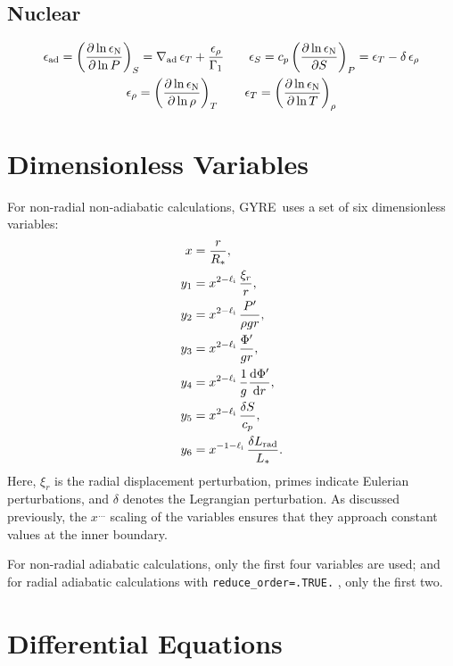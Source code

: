 \documentclass[fleqn]{article}
\newcommand{\gyre}{GYRE}
\newcommand{\diff}{\mathrm{d}}
\newcommand{\elli}{\ell_{\rm i}}
\newcommand{\nabad}{\nabla_{\rm ad}}
\newcommand{\epsad}{\epsilon_{\rm ad}}
\newcommand{\epsS}{\epsilon_{S}}
\newcommand{\epsrho}{\epsilon_{\rho}}
\newcommand{\epsT}{\epsilon_{T}}
\newcommand{\Rstar}{R_{\ast}}
\newcommand{\Lrad}{L_{\rm rad}}
\newcommand{\Lstar}{L_{\ast}}
\begin{document}
\subsection*{Nuclear}

\begin{gather*}
\epsad = \left( \frac{\partial \ln \epsilon_{\rm N}}{\partial \ln P} \right)_{S} = \nabad\, \epsT + \frac{\epsrho}{\Gamma_{1}} \qquad
\epsS = c_{p} \left( \frac{\partial \ln \epsilon_{\rm N}}{\partial S} \right)_{P} = \epsT - \delta\, \epsrho \\
\epsrho = \left( \frac{\partial \ln \epsilon_{\rm N}}{\partial \ln \rho} \right)_{T} \qquad
\epsT = \left( \frac{\partial \ln \epsilon_{\rm N}}{\partial \ln T} \right)_{\rho}
\end{gather*}


\section*{Dimensionless Variables}

For non-radial non-adiabatic calculations, \gyre\ uses a set of
six dimensionless variables:
\begin{align*}
x     &= \frac{r}{\Rstar}, \\
y_{1} &= x^{2-\elli}\, \frac{\xi_{r}}{r}, \\
y_{2} &= x^{2-\elli}\, \frac{P'}{\rho g r}, \\
y_{3} &= x^{2-\elli}\, \frac{\Phi'}{gr}, \\
y_{4} &= x^{2-\elli}\, \frac{1}{g} \frac{\diff \Phi'}{\diff r}, \\
y_{5} &= x^{2-\elli}\, \frac{\delta S}{c_{p}}, \\
y_{6} &= x^{-1-\elli}\, \frac{\delta \Lrad}{\Lstar}.
\end{align*}
Here, $\xi_{r}$ is the radial displacement perturbation, primes
indicate Eulerian perturbations, and $\delta$ denotes the Legrangian
perturbation. As discussed previously, the $x^{\ldots}$ scaling of
the variables ensures that they approach constant values at the
inner boundary.

For non-radial adiabatic calculations, only the first four variables
are used; and for radial adiabatic calculations with
\texttt{reduce\_order=.TRUE.} , only the first two.


\section*{Differential Equations}
\end{document}
